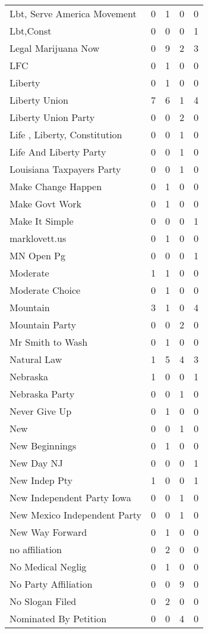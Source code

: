 \begin{supertabular}{lrrrr}
Lbt, Serve America Movement & 0 & 1 & 0 & 0\\
Lbt,Const & 0 & 0 & 0 & 1\\
Legal Marijuana Now & 0 & 9 & 2 & 3\\
LFC & 0 & 1 & 0 & 0\\
Liberty & 0 & 1 & 0 & 0\\
Liberty Union & 7 & 6 & 1 & 4\\
Liberty Union Party & 0 & 0 & 2 & 0\\
Life , Liberty, Constitution & 0 & 0 & 1 & 0\\
Life And Liberty Party & 0 & 0 & 1 & 0\\
Louisiana Taxpayers Party & 0 & 0 & 1 & 0\\
Make Change Happen & 0 & 1 & 0 & 0\\
Make Govt Work & 0 & 1 & 0 & 0\\
Make It Simple & 0 & 0 & 0 & 1\\
marklovett.us & 0 & 1 & 0 & 0\\
MN Open Pg & 0 & 0 & 0 & 1\\
Moderate & 1 & 1 & 0 & 0\\
Moderate Choice & 0 & 1 & 0 & 0\\
Mountain & 3 & 1 & 0 & 4\\
Mountain Party & 0 & 0 & 2 & 0\\
Mr Smith to Wash & 0 & 1 & 0 & 0\\
Natural Law & 1 & 5 & 4 & 3\\
Nebraska & 1 & 0 & 0 & 1\\
Nebraska Party & 0 & 0 & 1 & 0\\
Never Give Up & 0 & 1 & 0 & 0\\
New & 0 & 0 & 1 & 0\\
New Beginnings & 0 & 1 & 0 & 0\\
New Day NJ & 0 & 0 & 0 & 1\\
New Indep Pty & 1 & 0 & 0 & 1\\
New Independent Party Iowa & 0 & 0 & 1 & 0\\
New Mexico Independent Party & 0 & 0 & 1 & 0\\
New Way Forward & 0 & 1 & 0 & 0\\
no  affiliation & 0 & 2 & 0 & 0\\
No Medical Neglig & 0 & 1 & 0 & 0\\
No Party Affiliation & 0 & 0 & 9 & 0\\
No Slogan Filed & 0 & 2 & 0 & 0\\
Nominated By Petition & 0 & 0 & 4 & 0\\

\end{supertabular}
